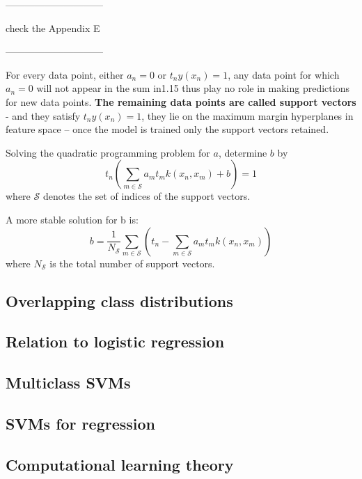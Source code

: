 \documentclass[twoside]{article}
\begin{document}
------------------------------

check the Appendix E

------------------------------

For every data point, either $a_n=0$ or $t_ny(x_n)=1$, any data point for which $a_n=0$ will not appear in the sum in1.15 thus play no role in making predictions for new data points. \textbf{The remaining data points are called support vectors} - and they satisfy $t_ny(x_n)=1$, they lie on the maximum margin hyperplanes in feature space -- once the model is trained only the support vectors retained.

Solving the quadratic programming problem for $a$, determine $b$ by 
\begin{equation}
t_n(\sum_{m\in \mathcal{S}} a_mt_mk(x_n, x_m)+b)=1
\end{equation} where $\mathcal{S}$ denotes the set of indices of the support vectors.

A more stable solution for b is:
\begin{equation}
b=\frac{1}{N_{\mathcal{S}}} \sum_{m\in \mathcal{S}} (t_n - \sum_{m\in \mathcal{S}} a_mt_mk(x_n, x_m) )
\end{equation}
where $N_{\mathcal{S}}$ is the total number of support vectors.

\subsection{Overlapping class distributions}

\subsection{Relation to logistic regression}

\subsection{Multiclass SVMs}

\subsection{SVMs for regression}

\subsection{Computational learning theory}


\end{document}
